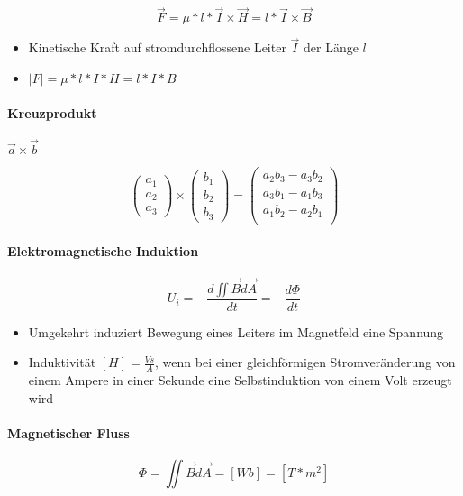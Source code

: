 $$\vec{F} = \mu * l * \vec{I} \times \vec{H} = l * \vec{I} \times \vec{B}$$

\begin{itemize}
  \item Kinetische Kraft auf stromdurchflossene Leiter $\vec{I}$ der Länge $l$
  \item $|F| = \mu * l * I * H = l * I * B$
\end{itemize}

\paragraph{Kreuzprodukt} $\vec{a} \times \vec{b}$

$$\begin{pmatrix}
    a_1 \\ a_2 \\ a_3
  \end{pmatrix} \times \begin{pmatrix}
    b_1 \\ b_2 \\ b_3
  \end{pmatrix} = \begin{pmatrix}
    a_2b_3 - a_3b_2 \\
    a_3b_1 - a_1b_3 \\
    a_1b_2 - a_2b_1 \\
  \end{pmatrix}$$

\paragraph{Elektromagnetische Induktion}

$$U_i = - \frac{d \iint \vec{B} d\vec{A}}{dt} = - \frac{d \Phi}{dt}$$

\begin{itemize}
  \item Umgekehrt induziert Bewegung eines Leiters im Magnetfeld eine Spannung
  \item Induktivität $[H] = \frac{Vs}{A}$, wenn bei einer gleichförmigen Stromveränderung von einem Ampere in einer Sekunde eine Selbstinduktion von einem Volt erzeugt wird
\end{itemize}

\paragraph{Magnetischer Fluss}

$$\Phi = \iint \vec{B} d \vec{A} = [Wb] = [T * m^2]$$

